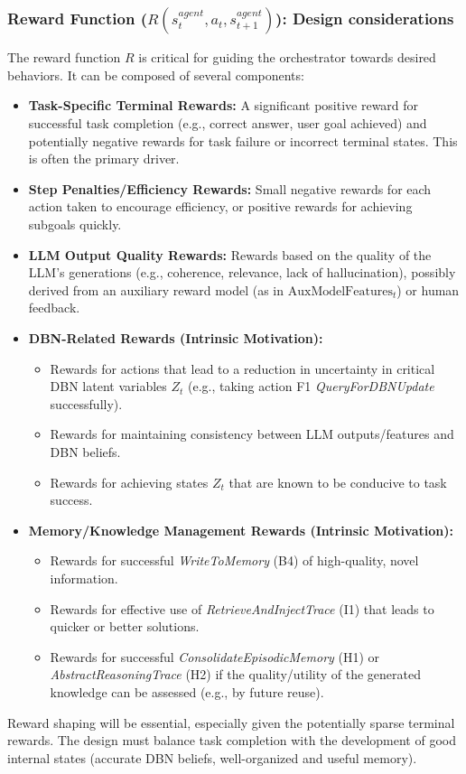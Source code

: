 \documentclass[11pt]{article}
\begin{document}
\subsubsection{Reward Function ($R(s_t^{agent}, a_t, s_{t+1}^{agent})$): Design considerations}
\label{sssec:mdp_reward}
The reward function $R$ is critical for guiding the orchestrator towards desired behaviors. It can be composed of several components:
\begin{itemize}
    \item \textbf{Task-Specific Terminal Rewards:} A significant positive reward for successful task completion (e.g., correct answer, user goal achieved) and potentially negative rewards for task failure or incorrect terminal states. This is often the primary driver.
    \item \textbf{Step Penalties/Efficiency Rewards:} Small negative rewards for each action taken to encourage efficiency, or positive rewards for achieving subgoals quickly.
    \item \textbf{LLM Output Quality Rewards:} Rewards based on the quality of the LLM's generations (e.g., coherence, relevance, lack of hallucination), possibly derived from an auxiliary reward model (as in $\text{AuxModelFeatures}_t$) or human feedback.
    \item \textbf{DBN-Related Rewards (Intrinsic Motivation):}
    \begin{itemize}
        \item Rewards for actions that lead to a reduction in uncertainty in critical DBN latent variables $Z_t$ (e.g., taking action F1 \emph{QueryForDBNUpdate} successfully).
        \item Rewards for maintaining consistency between LLM outputs/features and DBN beliefs.
        \item Rewards for achieving states $Z_t$ that are known to be conducive to task success.
    \end{itemize}
    \item \textbf{Memory/Knowledge Management Rewards (Intrinsic Motivation):}
    \begin{itemize}
        \item Rewards for successful \emph{WriteToMemory} (B4) of high-quality, novel information.
        \item Rewards for effective use of \emph{RetrieveAndInjectTrace} (I1) that leads to quicker or better solutions.
        \item Rewards for successful \emph{ConsolidateEpisodicMemory} (H1) or \emph{AbstractReasoningTrace} (H2) if the quality/utility of the generated knowledge can be assessed (e.g., by future reuse).
    \end{itemize}
\end{itemize}
Reward shaping will be essential, especially given the potentially sparse terminal rewards. The design must balance task completion with the development of good internal states (accurate DBN beliefs, well-organized and useful memory).
\end{document}

